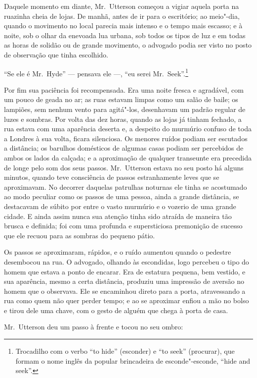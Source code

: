 Daquele momento em diante, Mr.~Utterson começou a vigiar aquela porta na
ruazinha cheia de lojas.  De manhã, antes de ir para o escritório; ao
meio"-dia, quando o movimento no local parecia mais intenso e o tempo
mais escasso; e à noite, sob o olhar da enevoada lua urbana, sob todos
os tipos de luz e em todas as horas de solidão ou de grande movimento,
o advogado podia ser visto no posto de observação que tinha escolhido.

“Se ele é Mr.~Hyde” --- pensava ele ---, “eu serei Mr.~Seek”.\footnote{ Trocadilho
com o verbo “to hide” (esconder) e “to seek” (procurar), que formam o nome
inglês da popular brincadeira de esconde"-esconde, “hide and seek”.}

Por fim sua paciência foi recompensada.  Era uma noite fresca e
agradável, com um pouco de geada no ar; as ruas estavam limpas como um
salão de baile; os lampiões, sem nenhum vento para agitá"-los,
desenhavam um padrão regular de luzes e sombras.  Por volta das dez
horas, quando as lojas já tinham fechado, a rua estava com uma
aparência deserta e, a despeito do murmúrio confuso de toda a Londres à
sua volta, ficara silenciosa.  Os menores ruídos podiam ser escutados a
distância; os barulhos domésticos de algumas casas podiam ser
percebidos de ambos os lados da calçada;  e a aproximação de qualquer
transeunte era precedida de longe pelo som dos seus passos. Mr.~Utterson 
estava no seu posto há alguns minutos, quando teve consciência
de passos estranhamente leves que se aproximavam.  No decorrer daquelas
patrulhas noturnas ele tinha se acostumado ao modo peculiar como os
passos de uma pessoa, ainda a grande distância, se destacavam de súbito
por entre o vasto murmúrio e o vozerio de uma grande cidade.  E ainda
assim nunca sua atenção tinha sido atraída de maneira tão brusca e
definida; foi com uma profunda e supersticiosa premonição de sucesso
que ele recuou para as sombras do pequeno pátio.

Os passos se aproximaram, rápidos, e o ruído aumentou quando o pedestre
desembocou na rua.  O advogado, olhando às escondidas, logo percebeu o
tipo do homem que estava a ponto de encarar.  Era de estatura pequena,
bem vestido, e sua aparência, mesmo a certa distância, produziu uma
impressão de aversão no homem que o observava.  Ele se encaminhou
direto para a porta, atravessando a rua como quem não quer perder
tempo; e ao se aproximar enfiou a mão no bolso e tirou dele uma chave,
com o gesto de alguém que chega à porta de casa.  

Mr.~Utterson deu um passo à frente e tocou no seu ombro:

